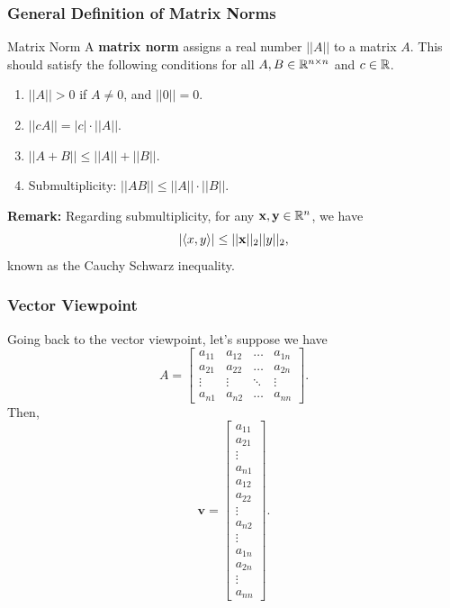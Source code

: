 \documentclass[letterpaper]{article}
\newcommand{\0}{\mathbf{0}}
\newcommand{\y}{\mathbf{y}}
\newcommand{\x}{\mathbf{x}}
\newcommand{\vv}{\mathbf{v}}
\begin{document}
\subsubsection{General Definition of Matrix Norms}
\begin{definition}{Matrix Norm}{}
    A \textbf{matrix norm} assigns a real number $||A||$ to a matrix $A$. This should satisfy the following conditions for all $A, B \in \mathbb{R}^{n \times n}$ and $c \in \mathbb{R}$. 
    \begin{enumerate}
        \item $||A|| > 0$ if $A \neq 0$, and $||0|| = 0$. 
        \item $||cA|| = |c| \cdot ||A||$. 
        \item $||A + B|| \leq ||A|| + ||B||$.
        \item Submultiplicity: $||AB|| \leq ||A|| \cdot ||B||$.  
    \end{enumerate}
\end{definition}
\textbf{Remark:} Regarding submultiplicity, for any $\x, \y \in \R^n$, we have \[|\cyclic{x, y}| \leq ||\x||_2 ||y||_2,\] known as the Cauchy Schwarz inequality. 

\subsubsection{Vector Viewpoint}
Going back to the vector viewpoint, let's suppose we have \[A = \begin{bmatrix}
    a_{11} & a_{12} & \hdots & a_{1n} \\ 
    a_{21} & a_{22} & \hdots & a_{2n} \\ 
    \vdots & \vdots & \ddots & \vdots \\ 
    a_{n1} & a_{n2} & \hdots & a_{nn}
\end{bmatrix}.\] Then, 
\[\vv = \begin{bmatrix}
    a_{11} \\ a_{21} \\ \vdots \\ a_{n1} \\ a_{12} \\ a_{22} \\ \vdots \\ a_{n2} \\ \vdots \\ a_{1n} \\ a_{2n} \\ \vdots \\ a_{nn}
\end{bmatrix}.\]
\end{document}
